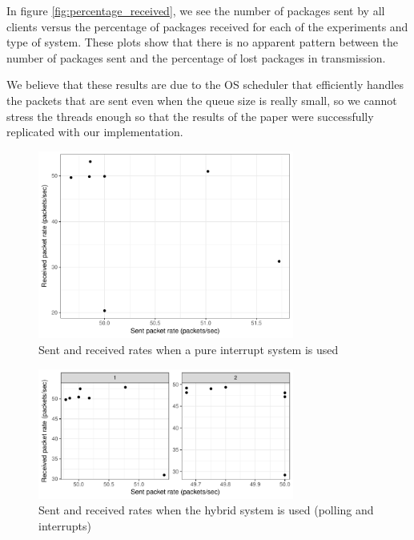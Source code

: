 \documentclass{article}
\begin{document}
In figure \ref{fig:percentage_received}, we see the number of packages sent by all clients versus the percentage of packages received for each of the experiments and type of system. These plots show that there is no apparent pattern between the number of packages sent and the percentage of lost packages in transmission.

We believe that these results are due to the OS scheduler that efficiently handles the packets that are sent even when the queue size is really small, so we cannot stress the threads enough so that the results of the paper were successfully replicated with our implementation.

\begin{figure}[H]
    \centering
    \includegraphics[width=0.75\textwidth]{interrupt_rates.pdf}
    \caption{Sent and received rates when a pure interrupt system is used}
    \label{fig:interrupt_rates}
\end{figure}


\begin{figure}[H]
    \centering
    \includegraphics[width=0.75\textwidth]{polling_rates.pdf}
    \caption{Sent and received rates when the hybrid system is used (polling and interrupts)}
    \label{fig:polling_rates}
\end{figure}
\end{document}
